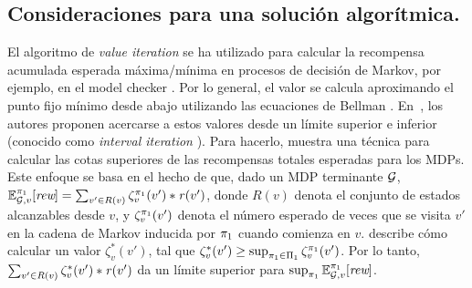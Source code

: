 \subsection{Consideraciones para una solución algorítmica.} 
El algoritmo de \emph{value iteration} \cite{Bellman57} se ha utilizado para calcular la recompensa acumulada esperada máxima/mínima en procesos de decisión de Markov, por ejemplo, en el model checker {\Prism}. Por lo general, el valor se calcula aproximando el punto fijo mínimo desde abajo utilizando las ecuaciones de Bellman \cite{Bellman57}. En~\cite{DBLP:conf/cav/Baier0L0W17}, los autores proponen acercarse a estos valores desde un límite superior e inferior (conocido como \emph{interval iteration} \cite{DBLP:journals/tcs/HaddadM18}). Para hacerlo, \cite{DBLP:conf/cav/Baier0L0W17} muestra una técnica para calcular las cotas superiores de las recompensas totales esperadas para los MDPs. Este enfoque se basa en el hecho de que, dado un MDP terminante $\mathcal{G}$, $\mathbb{E}^{\pi_{1}}_{\mathcal{G},v}[\textit{rew}] = \sum_{v' \in R(v)} \zeta_v^{\pi_{1}}(v')*\mathit{r}(v')$, donde $R(v)$ denota el conjunto de estados alcanzables desde $v$, y $\zeta_v ^{\pi_{1}}(v')$ denota el número esperado de veces que se visita $v'$ en la cadena de Markov inducida por $\pi_{1}$ cuando comienza en $v$. \cite{DBLP:conf/cav/Baier0L0W17} describe cómo calcular un valor $\zeta_{v}^*(v')$, tal que $\zeta_v^*(v') \geq \sup_{\pi_{ 1} \in \Pi_{1}} \zeta_v^{\pi_{1}}(v')$. Por lo tanto, $\sum_{v' \in R(v)} \zeta_v^{*}(v')*\mathit{r}(v')$ da un límite superior para $\sup_{\pi_{1}} \mathbb{E}^{\pi_{1}}_{\mathcal{G},v}[\textit{rew}]$.

